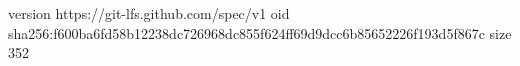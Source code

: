 version https://git-lfs.github.com/spec/v1
oid sha256:f600ba6fd58b12238dc726968dc855f624ff69d9dcc6b85652226f193d5f867c
size 352
